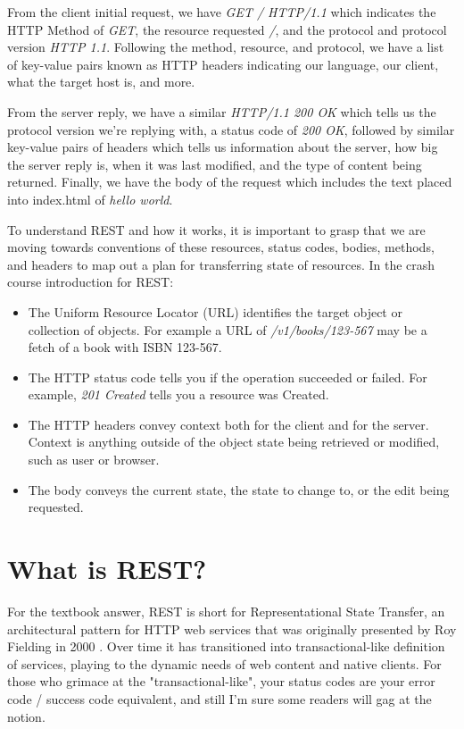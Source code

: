 From the client initial request, we have \textit{GET / HTTP/1.1} which indicates the HTTP Method of \textit{GET}, the resource requested \textit{/}, and the protocol and protocol version \textit{HTTP 1.1}.  Following the method, resource, and protocol, we have a list of key-value pairs known as HTTP headers indicating our language, our client, what the target host is, and more.

From the server reply, we have a similar \textit{HTTP/1.1 200 OK} which tells us the protocol version we're replying with, a status code of \textit{200 OK}, followed by similar key-value pairs of headers which tells us information about the server, how big the server reply is, when it was last modified, and the type of content being returned.  Finally, we have the body of the request which includes the text placed into index.html of \textit{hello world}.

To understand REST and how it works, it is important to grasp that we are moving towards conventions of these resources, status codes, bodies, methods, and headers to map out a plan for transferring state of resources.  In the crash course introduction for REST:
\begin{itemize}
  \item The Uniform Resource Locator (URL) identifies the target object or collection of objects.  For example a URL of \textit{/v1/books/123-567} may be a fetch of a book with ISBN 123-567.
  \item The HTTP status code tells you if the operation succeeded or failed.  For example, \textit{201 Created} tells you a resource was Created.
  \item The HTTP headers convey context both for the client and for the server.  Context is anything outside of the object state being retrieved or modified, such as user or browser.
  \item The body conveys the current state, the state to change to, or the edit being requested.
\end{itemize}

\section{What is REST?}

For the textbook answer, REST is short for Representational State Transfer, an architectural pattern for HTTP web services that was originally presented by Roy Fielding in 2000 \cite{fielding}.  Over time it has transitioned into transactional-like definition of services, playing to the dynamic needs of web content and native clients.  For those who grimace at the "transactional-like", your status codes are your error code / success code equivalent, and still I'm sure some readers will gag at the notion.


